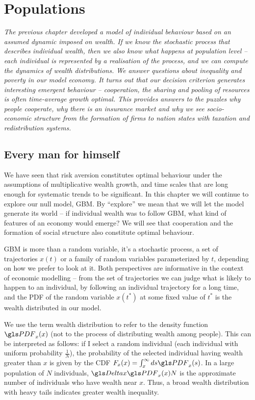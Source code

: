 \newpage

\section{Populations}
{\it 
The previous chapter developed a model of individual behaviour based on an
assumed dynamic imposed on wealth. If we know the stochastic process that describes
individual wealth, then we also know what happens at population level -- each individual
is represented by a realisation of the process, and we can compute 
the dynamics of wealth distributions. We answer questions about inequality and poverty in
our model economy. It turns out that our decision criterion generates interesting emergent
behaviour -- cooperation, the sharing and pooling of resources is often time-average 
growth optimal. This provides answers to the puzzles why people cooperate, why there 
is an insurance market and why we see socio-economic structure from the formation of 
firms to nation states with taxation and redistribution systems.}
\newpage

\subsection{Every man for himself}

We have seen that risk aversion constitutes optimal behaviour under the assumptions 
of multiplicative wealth growth, and time scales that are long enough for systematic 
trends to be significant. In this chapter we will continue to explore our null model, 
GBM. By ``explore'' we mean that we will let the model generate its world -- if 
individual wealth was to follow GBM, what kind of features of an economy would emerge? 
We will see that cooperation and the formation of social structure also constitute 
optimal behaviour.

GBM is more than a random variable, it's a stochastic process, \ie a set of trajectories 
$x(t)$ or  a family of random variables parameterized by $t$, depending on how we 
prefer to look at it.  Both perspectives are informative in the context of economic modelling
-- from the set of trajectories we can judge what is likely to happen to an individual, 
\eg by following an individual trajectory for a long time, and the PDF of the random 
variable $x(t^*)$ at some fixed value of $t^*$ is the wealth distributed in our model. 

We use the term wealth distribution to refer to the density function 
$\PDF_x(x)$ (not to the process of distributing wealth among people). This can be 
interpreted as follows: if I select a random individual (each individual with uniform probability 
$\frac{1}{N}$), the probability of the selected individual 
having wealth greater than $x$ is given by the CDF $F_x(x)=\int_x^\infty ds \PDF_x(s)$.
In a large population of $N$ individuals, $\D x \PDF_x(x)N$ is the approximate 
number of individuals who have wealth near $x$. 
Thus, a broad wealth distribution with heavy tails indicates greater wealth inequality. 

